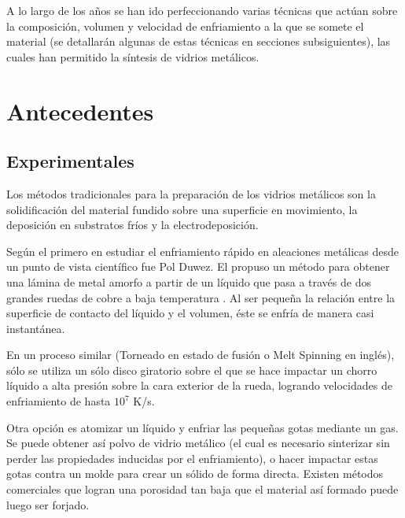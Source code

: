 A lo largo de los años se han ido perfeccionando varias técnicas que actúan sobre la composición, volumen y velocidad de enfriamiento a la que se somete el material (se detallarán algunas de estas técnicas en secciones subsiguientes), las cuales han permitido la síntesis de vidrios metálicos.


\section{Antecedentes}
\label{S1_2}


\subsection{Experimentales}
\label{S1_2_1}

Los métodos tradicionales para la preparación de los vidrios metálicos son la solidificación del material fundido sobre una superficie en movimiento, la deposición en substratos fríos y la electrodeposición.

Según \cite{liebermann93} el primero en estudiar el enfriamiento rápido en aleaciones metálicas desde un punto de vista científico fue Pol Duwez. El propuso un método para obtener una lámina de metal amorfo a partir de un líquido que pasa a través de dos grandes ruedas de cobre a baja temperatura \citep{duwez60}. Al ser pequeña la relación entre la superficie de contacto del líquido y el volumen, éste se enfría de manera casi instantánea.

En un proceso similar (Torneado en estado de fusión o Melt Spinning en inglés), sólo se utiliza un sólo disco giratorio sobre el que se hace impactar un chorro líquido a alta presión sobre la cara exterior de la rueda, logrando velocidades de enfriamiento de hasta $10^{7}$ K/s.

Otra opción es atomizar un líquido y enfriar las pequeñas gotas mediante un gas. Se puede obtener así polvo de vidrio metálico (el cual es necesario sinterizar sin perder las propiedades inducidas por el enfriamiento), o hacer impactar estas gotas contra un molde para crear un sólido de forma directa. Existen métodos comerciales que logran una porosidad tan baja que el material así formado puede luego ser forjado.

